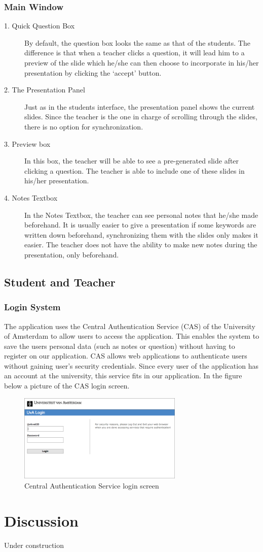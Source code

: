 \documentclass[11pt]{article}
\begin{document}
\subsubsection{Main Window}
\begin{description}
\item[1. Quick Question Box] By default, the question box looks the same as that of the students. The difference is that when a teacher clicks a question, it will lead him to a preview of the slide which he/she can then choose to incorporate in his/her presentation by clicking the `accept’ button. 

\item[2. The Presentation Panel] Just as in the students interface, the presentation panel shows the current slides. Since the teacher is the one in charge of scrolling through the slides, there is no option for synchronization. 

\item[3. Preview box] In this box, the teacher will be able to see a pre-generated slide after clicking a question. The teacher is able to include one of these slides in his/her presentation. 

\item[4. Notes Textbox] In the Notes Textbox, the teacher can see personal notes that he/she made beforehand. It is usually easier to give a presentation if some keywords are written down beforehand, synchronizing them with the slides only makes it easier. The teacher does not have the ability to make new notes during the presentation, only beforehand.
\end{description}
\subsection{Student and Teacher}
\subsubsection{Login System}
The application uses the Central Authentication Service (CAS) of the University of Amsterdam to allow users to access the application. This enables the system to save the users personal data (such as notes or question) without having to register on our application. CAS allows web applications to authenticate users without gaining user’s security credentials. Since every user of the application has an account at the university, this service fits in our application. In the figure below a picture of the CAS login screen.
\begin{figure}[!h]
\centering
\includegraphics[width=0.7\textwidth]{Cas.png}
\caption{Central Authentication Service login screen}
\end{figure}
\section{Discussion}
Under construction
\end{document}
